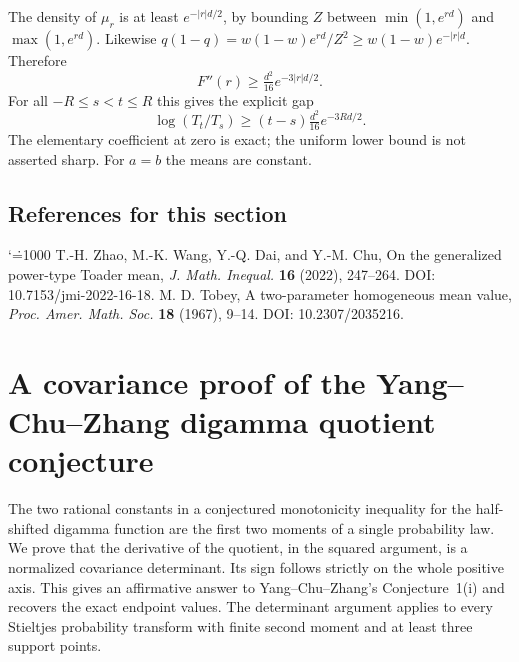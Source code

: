 \documentclass[11pt,a4paper]{article}
\makeatletter
\numberwithin{equation}{section}
\theoremstyle{definition}
\theoremstyle{remark}
\newenvironment{sectionabstract}{\par\smallskip\begingroup\small\noindent}{\par\endgroup\medskip}
\renewenvironment{thebibliography}[1]
 {\subsection*{References for this section}\small
  \list{\@biblabel{\@arabic\c@enumiv}}
       {\settowidth\labelwidth{\@biblabel{#1}}\leftmargin\labelwidth
        \advance\leftmargin\labelsep\@openbib@code
        \usecounter{enumiv}\let\p@enumiv\@empty
        \renewcommand\theenumiv{\@arabic\c@enumiv}}
  \sloppy\clubpenalty4000\widowpenalty4000\sfcode`\.=1000\relax}
 {\def\@noitemerr{\@latex@warning{Empty bibliography}}\endlist}
\makeatother
\begin{document}
The density of $\mu_r$ is at least $e^{-|r|d/2}$, by bounding $Z$
between $\min(1,e^{rd})$ and $\max(1,e^{rd})$. Likewise
$q(1-q)=w(1-w)e^{rd}/Z^2\ge w(1-w)e^{-|r|d}$. Therefore
\[
F''(r)\ge \tfrac{d^2}{16}e^{-3|r|d/2}.
\]
For all $-R\le s<t\le R$ this gives the explicit gap
\[
\log(T_t/T_s)\ge (t-s)\tfrac{d^2}{16}e^{-3Rd/2}.
\]
The elementary coefficient at zero is exact; the uniform lower
bound is not asserted sharp. For $a=b$ the means are constant.

\begin{thebibliography}{2}
 T.-H. Zhao, M.-K. Wang, Y.-Q. Dai, and Y.-M. Chu,
On the generalized power-type Toader mean, \emph{J. Math. Inequal.}
\textbf{16} (2022), 247--264. DOI: 10.7153/jmi-2022-16-18.
 M. D. Tobey, A two-parameter homogeneous mean value,
\emph{Proc. Amer. Math. Soc.} \textbf{18} (1967), 9--14.
DOI: 10.2307/2035216.
\end{thebibliography}

\par\endgroup

\begingroup
\newcommand{\E}{\mathbb E}
\newcommand{\Var}{\operatorname{Var}}
\newcommand{\Cov}{\operatorname{Cov}}
\section{\texorpdfstring{A covariance proof of the Yang--Chu--Zhang digamma quotient conjecture}{A covariance proof of the Yang--Chu--Zhang digamma quotient conjecture}}\label{section:r27taisho}
\par\medskip


\begin{sectionabstract}
The two rational constants in a conjectured monotonicity inequality for the
half-shifted digamma function are the first two moments of a single
probability law. We prove that the derivative of the quotient, in the squared
argument, is a normalized covariance determinant. Its sign follows strictly
on the whole positive axis. This gives an affirmative answer to
Yang--Chu--Zhang's Conjecture~1(i) and recovers the exact endpoint values.
The determinant argument applies to every Stieltjes probability transform
with finite second moment and at least three support points.
\end{sectionabstract}
\end{document}
